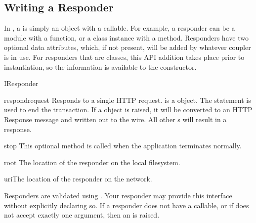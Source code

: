 \subsection{Writing a Responder \label{iresponder}}

In , a  is simply an object with a
 callable. For example, a responder can be a module with a
 function, or a class instance with a  method.
Responders have two optional data attributes, which, if not present, will be
added by whatever coupler is in use. For responders that are classes, this API
addition takes place prior to instantiation, so the information is available to
the constructor.

\begin{classdesc*}{IResponder}

\begin{funcdesc}{respond}{request} Responds to a single HTTP request.
 is a  object. The  statement is used to
end the transaction. If a  object is raised, it will be
converted to an HTTP Response message and written out to the wire. All other
s will result in a 
response.\end{funcdesc}

\begin{funcdesc}{stop}{} This optional method is called when the application
terminates normally. \end{funcdesc}

\begin{datadesc}{root} The location of the responder on the local
filesystem.\end{datadesc}

\begin{datadesc}{uri}The location of the responder on the network.\end{datadesc}

\end{classdesc*}

Responders are validated using . Your responder may
provide this interface without explicitly declaring so. If a responder does not
have a  callable, or if  does not accept
exactly one argument, then an  is raised.

